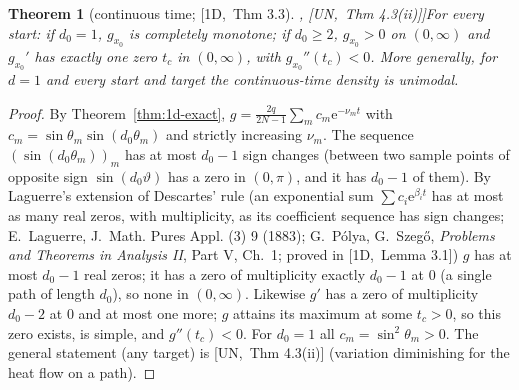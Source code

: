 \documentclass[10pt,a4paper]{article}
\theoremstyle{plain}
\newtheorem{theorem}{Theorem}[section]
\theoremstyle{definition}
\newcommand{\src}[2]{[\textsf{#1},~#2]}           %
\newcommand{\ONE}{\textsf{1D}}
\newcommand{\UNI}{\textsf{UN}}
\newcommand{\ee}{\mathrm{e}}
\begin{document}
\begin{theorem}[continuous time; \src{\ONE}{Thm 3.3}, \src{\UNI}{Thm 4.3(ii)}]\label{thm:1d-cont-unimodal}
For every start: if $d_0=1$, $g_{x_0}$ is completely monotone; if $d_0\ge2$, $g_{x_0}>0$ on $(0,\infty)$ and $g_{x_0}'$ has exactly one zero $t_c$ in $(0,\infty)$, with $g_{x_0}''(t_c)<0$. More generally, for $d=1$ and every start and target the continuous-time density is unimodal.
\end{theorem}
\begin{proof}
By Theorem~\ref{thm:1d-exact}, $g=\frac{2q}{2N-1}\sum_mc_m\ee^{-\nu_mt}$ with $c_m=\sin\theta_m\sin(d_0\theta_m)$ and strictly increasing $\nu_m$. The sequence $(\sin(d_0\theta_m))_m$ has at most $d_0-1$ sign changes (between two sample points of opposite sign $\sin(d_0\vartheta)$ has a zero in $(0,\pi)$, and it has $d_0-1$ of them). By Laguerre's extension of Descartes' rule (an exponential sum $\sum c_i\ee^{\beta_it}$ has at most as many real zeros, with multiplicity, as its coefficient sequence has sign changes; E.~Laguerre, J.~Math. Pures Appl. (3) 9 (1883); G.~P\'olya, G.~Szeg\H{o}, \emph{Problems and Theorems in Analysis II}, Part V, Ch.~1; proved in \src{\ONE}{Lemma 3.1}) $g$ has at most $d_0-1$ real zeros; it has a zero of multiplicity exactly $d_0-1$ at $0$ (a single path of length $d_0$), so none in $(0,\infty)$. Likewise $g'$ has a zero of multiplicity $d_0-2$ at $0$ and at most one more; $g$ attains its maximum at some $t_c>0$, so this zero exists, is simple, and $g''(t_c)<0$. For $d_0=1$ all $c_m=\sin^2\theta_m>0$. The general statement (any target) is \src{\UNI}{Thm 4.3(ii)} (variation diminishing for the heat flow on a path).
\end{proof}
\end{document}
